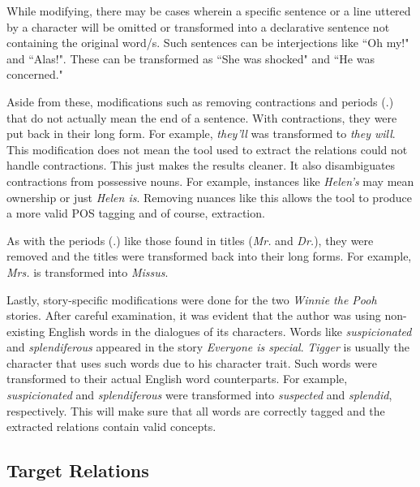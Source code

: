 While modifying, there may be cases wherein a specific sentence or a line uttered by a character will be omitted or transformed into a declarative sentence not containing the original word/s. Such sentences can be interjections like ``Oh my!" and ``Alas!". These can be transformed as ``She was shocked" and ``He was concerned."

Aside from these, modifications such as removing contractions and periods (.) that do not actually mean the end of a sentence. With contractions, they were put back in their long form. For example, \textit{they'll} was transformed to \textit{they will}. This modification does not mean the tool used to extract the relations could not handle contractions. This just makes the results cleaner. It also disambiguates contractions from possessive nouns. For example, instances like \textit{Helen's} may mean ownership or just \textit{Helen is}. Removing nuances like this allows the tool to produce a more valid POS tagging and of course, extraction. 

As with the periods (.) like those found in titles (\textit{Mr.} and \textit{Dr.}), they were removed and the titles were transformed back into their long forms. For example, \textit{Mrs.} is transformed into \textit{Missus}. 

Lastly, story-specific modifications were done for the two \textit{Winnie the Pooh} stories. After careful examination, it was evident that the author was using non-existing English words in the dialogues of its characters. Words like \textit{suspicionated} and \textit{splendiferous} appeared in the story \textit{Everyone is special}. \textit{Tigger} is usually the character that uses such words due to his character trait. Such words were transformed to their actual English word counterparts. For example, \textit{suspicionated} and \textit{splendiferous} were transformed into \textit{suspected} and \textit{splendid}, respectively. This will make sure that all words are correctly tagged and the extracted relations contain valid concepts.

\subsection{Target Relations}
\label{sec:relations}

